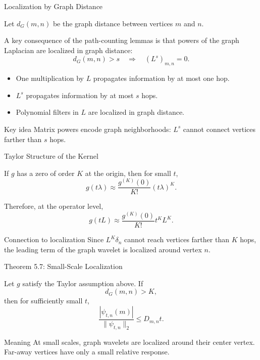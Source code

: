 \documentclass[aspectratio=1610,xcolor=dvipsnames,t]{beamer}
\begin{document}
\begin{frame}{Localization by Graph Distance}

Let $d_G(m,n)$ be the graph distance between vertices $m$ and $n$.

\medskip

A key consequence of the path-counting lemmas is that powers of the graph Laplacian are localized in graph distance:
\[
d_G(m,n)>s
\quad\Rightarrow\quad
(L^s)_{m,n}=0.
\]

\begin{itemize}
  \item One multiplication by $L$ propagates information by at most one hop.
  \item $L^s$ propagates information by at most $s$ hops.
  \item Polynomial filters in $L$ are localized in graph distance.
\end{itemize}

\begin{block}{Key idea}
Matrix powers encode graph neighborhoods: $L^s$ cannot connect vertices farther than $s$ hops.
\end{block}

\end{frame}

\begin{frame}{Taylor Structure of the Kernel}

If $g$ has a zero of order $K$ at the origin, then for small $t$,
\[
g(t\lambda)
\approx
\frac{g^{(K)}(0)}{K!}(t\lambda)^K.
\]

Therefore, at the operator level,
\[
g(tL)
\approx
\frac{g^{(K)}(0)}{K!}t^K L^K.
\]

\begin{block}{Connection to localization}
Since $L^K\delta_n$ cannot reach vertices farther than $K$ hops,
the leading term of the graph wavelet is localized around vertex $n$.
\end{block}

\end{frame}

\begin{frame}{Theorem 5.7: Small-Scale Localization}

Let $g$ satisfy the Taylor assumption above.
If
\[
d_G(m,n)>K,
\]
then for sufficiently small $t$,
\[
\frac{|\psi_{t,n}(m)|}{\|\psi_{t,n}\|_2}
\leq
D_{m,n}t.
\tag{SGWT Eq.~42}
\]

\begin{block}{Meaning}
At small scales, graph wavelets are localized around their center vertex.
Far-away vertices have only a small relative response.
\end{block}

\end{frame}
\end{document}
